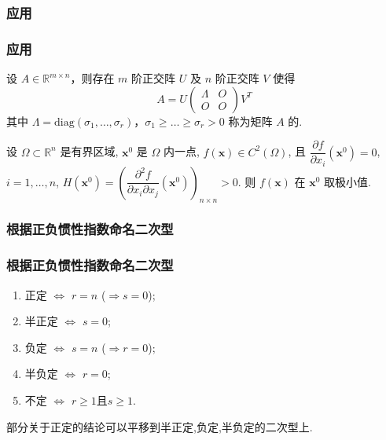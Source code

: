 \subsubsection{应用}
\begin{frame}\frametitle{应用}
\begin{theorem}[矩阵的奇异值分解] 设 $A \in \mathbb{R}^{m \times n}$，则存在 $m$ 阶正交阵 $U$ 及 $n$ 阶正交阵 $V$ 使得
\begin{equation*}
A = U \begin{pmatrix}\Lambda & O \\O & O\end{pmatrix} V^T
\end{equation*}
其中 $\Lambda = \text{diag}(\sigma_1, \ldots, \sigma_r)$，$\sigma_1 \geq \ldots \geq \sigma_r > 0$ 称为矩阵 $A$ 的.
\end{theorem}
\pp {}
\pp
\begin{theorem}[多元函数的极值] 设 $\Omega \subset \mathbb{R}^n$ 是有界区域, $\mathbf{x}^0 $ 是 $\Omega$ 内一点, $f(\mathbf{x}) \in C^2(\Omega)$, 且 $\dfrac{\partial f}{\partial x_i}(\mathbf{x}^0) = 0$, $i = 1, \ldots, n$, $H(\mathbf{x}^0) = \left( \dfrac{\partial^2 f}{\partial x_i \partial x_j}(\mathbf{x}^0) \right)_{n \times n} > 0$. 则 $f(\mathbf{x})$ 在 $\mathbf{x}^0$ 取极小值.
\end{theorem}
\pp
{}
\end{frame}





\subsubsection{根据正负惯性指数命名二次型}
\begin{frame}\frametitle{根据正负惯性指数命名二次型}
\begin{enumerate}
\item 正\quad 定 $\Leftrightarrow$ $r=n$ ($\Rightarrow s=0$);
\pp
\item 半正定 $\Leftrightarrow$ $s=0$;
\pp
\item 负\quad 定 $\Leftrightarrow$ $s=n$ ($\Rightarrow r=0$);
\pp
\item 半负定 $\Leftrightarrow$ $r=0$;
\pp
\item 不\quad 定 $\Leftrightarrow$ $r\geq1$且$s\geq1$.
\end{enumerate}
\pp
部分关于正定的结论可以平移到半正定,负定,半负定的二次型上.
\end{frame}



